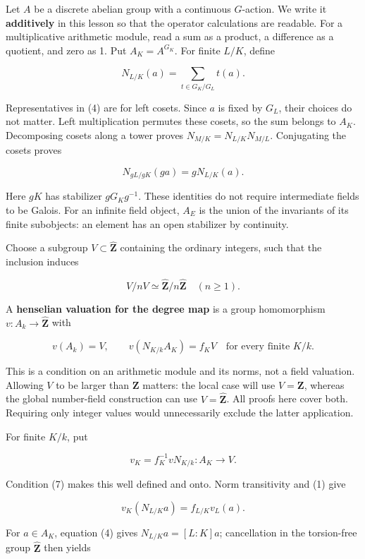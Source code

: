 \documentclass[11pt,a4paper]{article}
\begin{document}
Let \(A\) be a discrete abelian group with a continuous \(G\)-action. We
write it \textbf{additively} in this lesson so that the operator
calculations are readable. For a multiplicative arithmetic module, read
a sum as a product, a difference as a quotient, and zero as 1. Put
\(A_K=A^{G_K}\). For finite \(L/K\), define

\[
N_{L/K}(a)=\sum_{t\in G_K/G_L}t(a).
\tag{4}
\]

Representatives in (4) are for left cosets. Since \(a\) is fixed by
\(G_L\), their choices do not matter. Left multiplication permutes these
cosets, so the sum belongs to \(A_K\). Decomposing cosets along a tower
proves \(N_{M/K}=N_{L/K}N_{M/L}\). Conjugating the cosets proves

\[
N_{gL/gK}(ga)=gN_{L/K}(a).
\tag{5}
\]

Here \(gK\) has stabilizer \(gG_Kg^{-1}\). These identities do not
require intermediate fields to be Galois. For an infinite field object,
\(A_E\) is the union of the invariants of its finite subobjects: an
element has an open stabilizer by continuity.

Choose a subgroup \(V\subset\widehat{\mathbf Z}\) containing the
ordinary integers, such that the inclusion induces

\[
V/nV\simeq\widehat{\mathbf Z}/n\widehat{\mathbf Z}
\quad(n\geq1).
\tag{6}
\]

A \textbf{henselian valuation for the degree map} is a group
homomorphism \(v:A_k\to\widehat{\mathbf Z}\) with

\[
v(A_k)=V,\qquad v(N_{K/k}A_K)=f_KV
\quad\text{for every finite }K/k.
\tag{7}
\]

This is a condition on an arithmetic module and its norms, not a field
valuation. Allowing \(V\) to be larger than \(\mathbf Z\) matters: the
local case will use \(V=\mathbf Z\), whereas the global number-field
construction can use \(V=\widehat{\mathbf Z}\). All proofs here cover
both. Requiring only integer values would unnecessarily exclude the
latter application.

For finite \(K/k\), put

\[
v_K=f_K^{-1}vN_{K/k}:A_K\longrightarrow V.
\]

Condition (7) makes this well defined and onto. Norm transitivity and
(1) give

\[
v_K(N_{L/K}a)=f_{L/K}v_L(a).
\tag{8}
\]

For \(a\in A_K\), equation (4) gives \(N_{L/K}a=[L:K]a\); cancellation
in the torsion-free group \(\widehat{\mathbf Z}\) then yields
\end{document}

